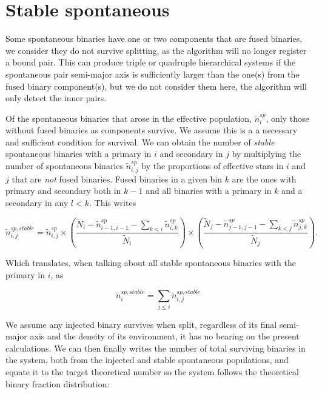 \section{Stable spontaneous}

Some spontaneous binaries have one or two components that are fused binaries, we consider they do not survive splitting, as the algorithm will no longer register a bound pair. This can produce triple or quadruple hierarchical  systems if the spontaneous pair semi-major axis is sufficiently larger than the one(s) from the fused binary component(s), but we do not consider them here, the algorithm will only detect the inner pairs.

Of the spontaneous binaries that arose in the effective population,  $\tilde{n}_i^{sp}$, only those without fused binaries as components survive. We assume this is a a necessary and sufficient condition for survival. We can obtain the number of \textit{stable} spontaneous binaries with a primary in $i$ and secondary in $j$ by multiplying the number of spontaneous binaries $\tilde{n}_{i,j}^{sp}$ by the proportions of effective stars in $i$ and $j$ that are \textit{not} fused binaries. Fused binaries in a given bin $k$ are the ones with primary and secondary both in $k-1$ and all binaries with a primary in $k$ and a secondary in any $l<k$. This writes

\begin{equation}
\tilde{n}_{i,j}^{sp,stable} = \tilde{n}_{i,j}^{sp}  	 \times
\left( \frac{	\tilde{N}_i -
				\tilde{n}_{i-1,i-1}^{sp} - 
				\sum\limits_{k<i} \tilde{n}_{i,k}^{sp} }{\tilde{N}_i } \right) \times
\left( \frac{ 	\tilde{N}_j -
				\tilde{n}_{j-1,j-1}^{sp} - 
				\sum\limits_{k<j} \tilde{n}_{j,k}^{sp} }{\tilde{N}_j } \right).
\end{equation}

Which translates, when talking about all stable spontaneous binaries with the primary in $i$, as

\begin{equation}
\tilde{n}_{i}^{sp,stable} = \sum\limits_{j\le i} \tilde{n}_{i,j}^{sp,stable}  
\end{equation}


We assume any injected binary survives when split, regardless of its final semi-major axis and the density of its environment, it has no bearing on the present calculations. We can then finally writes the number of total surviving binaries in the system, both from the injected and stable spontaneous populations, and equate it to the target theoretical number so the system follows the theoretical binary fraction distribution:

